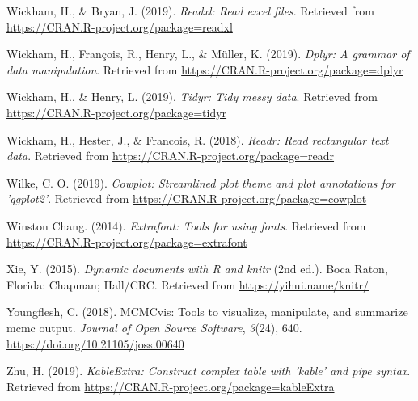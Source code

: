 \documentclass[english,man,floatsintext]{apa6}
\begin{document}
\leavevmode\hypertarget{ref-R-readxl}{}%
Wickham, H., \& Bryan, J. (2019). \emph{Readxl: Read excel files}. Retrieved from \url{https://CRAN.R-project.org/package=readxl}

\leavevmode\hypertarget{ref-R-dplyr}{}%
Wickham, H., François, R., Henry, L., \& Müller, K. (2019). \emph{Dplyr: A grammar of data manipulation}. Retrieved from \url{https://CRAN.R-project.org/package=dplyr}

\leavevmode\hypertarget{ref-R-tidyr}{}%
Wickham, H., \& Henry, L. (2019). \emph{Tidyr: Tidy messy data}. Retrieved from \url{https://CRAN.R-project.org/package=tidyr}

\leavevmode\hypertarget{ref-R-readr}{}%
Wickham, H., Hester, J., \& Francois, R. (2018). \emph{Readr: Read rectangular text data}. Retrieved from \url{https://CRAN.R-project.org/package=readr}

\leavevmode\hypertarget{ref-R-cowplot}{}%
Wilke, C. O. (2019). \emph{Cowplot: Streamlined plot theme and plot annotations for 'ggplot2'}. Retrieved from \url{https://CRAN.R-project.org/package=cowplot}

\leavevmode\hypertarget{ref-R-extrafont}{}%
Winston Chang. (2014). \emph{Extrafont: Tools for using fonts}. Retrieved from \url{https://CRAN.R-project.org/package=extrafont}

\leavevmode\hypertarget{ref-R-knitr}{}%
Xie, Y. (2015). \emph{Dynamic documents with R and knitr} (2nd ed.). Boca Raton, Florida: Chapman; Hall/CRC. Retrieved from \url{https://yihui.name/knitr/}

\leavevmode\hypertarget{ref-R-MCMCvis}{}%
Youngflesh, C. (2018). MCMCvis: Tools to visualize, manipulate, and summarize mcmc output. \emph{Journal of Open Source Software}, \emph{3}(24), 640. \url{https://doi.org/10.21105/joss.00640}

\leavevmode\hypertarget{ref-R-kableExtra}{}%
Zhu, H. (2019). \emph{KableExtra: Construct complex table with 'kable' and pipe syntax}. Retrieved from \url{https://CRAN.R-project.org/package=kableExtra}

\endgroup

\clearpage
\renewcommand{\listfigurename}{Figure captions}

\clearpage
\renewcommand{\listtablename}{Table captions}
\end{document}
